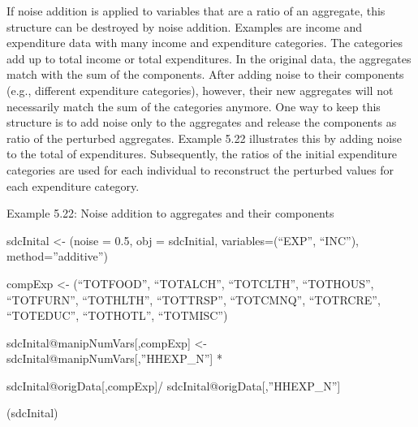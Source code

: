 \documentclass[letterpaper,10pt,english]{sphinxmanual}
\begin{document}
If noise addition is applied to variables that are a ratio of an
aggregate, this structure can be destroyed by noise addition. Examples
are income and expenditure data with many income and expenditure
categories. The categories add up to total income or total expenditures.
In the original data, the aggregates match with the sum of the
components. After adding noise to their components (e.g., different
expenditure categories), however, their new aggregates will not
necessarily match the sum of the categories anymore. One way to keep
this structure is to add noise only to the aggregates and release the
components as ratio of the perturbed aggregates. Example 5.22
illustrates this by adding noise to the total of expenditures.
Subsequently, the ratios of the initial expenditure categories are used
for each individual to reconstruct the perturbed values for each
expenditure category.

Example 5.22: Noise addition to aggregates and their components

\begin{DUlineblock}{0em}
\item[] 
\item[] sdcInital \textless{}- (noise = 0.5, obj = sdcInitial,
variables=(“EXP”, “INC”), method=”additive”)
\end{DUlineblock}

\begin{DUlineblock}{0em}
\item[] 
\item[] compExp \textless{}- (“TOTFOOD”, “TOTALCH”, “TOTCLTH”, “TOTHOUS”,
“TOTFURN”, “TOTHLTH”, “TOTTRSP”, “TOTCMNQ”, “TOTRCRE”, “TOTEDUC”,
“TOTHOTL”, “TOTMISC”)
\end{DUlineblock}

sdcInital@manipNumVars{[},compExp{]} \textless{}- sdcInital@manipNumVars{[},”HHEXP\_N”{]}
*

sdcInital@origData{[},compExp{]}/ sdcInital@origData{[},”HHEXP\_N”{]}

\begin{DUlineblock}{0em}
\item[] 
\item[] (sdcInital)
\end{DUlineblock}
\end{document}
